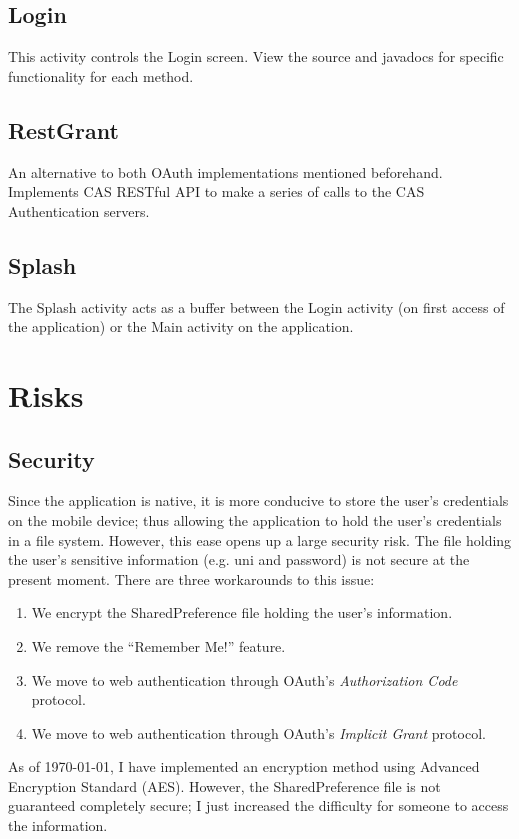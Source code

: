 \documentclass{article}
\begin{document}
\subsection{Login}
This activity controls the Login screen. View the source and javadocs for specific 
functionality for each method.


\subsection{RestGrant}
An alternative to both OAuth implementations mentioned beforehand. Implements CAS RESTful 
API to make a series of calls to the CAS Authentication servers.

\subsection{Splash} 
The Splash activity acts as a buffer between the Login activity (on first access of the 
application) or the Main activity on the application. 


\section{Risks}
\subsection{Security}
Since the application is native, it is more conducive to store the user's credentials on 
the mobile device; thus allowing the application to hold the user's credentials in a file 
system. However, this ease opens up a large security risk. The file holding the user's 
sensitive information (e.g. uni and password) is not secure at the present moment. There 
are three workarounds to this issue:
 \begin{enumerate}
    \item   We encrypt the SharedPreference file holding the user's information.
    \item   We remove the ``Remember Me!'' feature.
    \item   We move to web authentication through OAuth's \emph{Authorization Code}     
            protocol.
    \item   We move to web authentication through OAuth's \emph{Implicit Grant} protocol.
\end{enumerate}
As of \today, I have implemented an encryption method using Advanced Encryption Standard (AES). However, the SharedPreference file is not guaranteed completely secure; I just increased the difficulty for someone to access the information.
\end{document}
